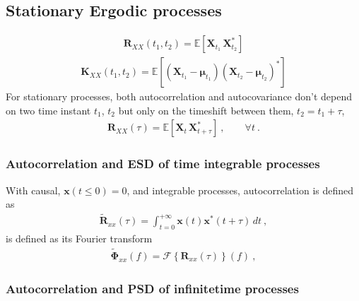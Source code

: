 \documentclass[letterpaper,10pt,english]{jupyterBook}
\begin{document}
\subsection{Stationary Ergodic processes}
\label{\detokenize{ch/system-theory/lti-response:stationary-ergodic-processes}}
\sphinxAtStartPar
{}
\begin{equation*}
\begin{split}\mathbf{R}_{XX}(t_1, t_2) = \mathbb{E}\left[ \mathbf{X}_{t_1} \, \mathbf{X}_{t_2}^* \right]\end{split}
\end{equation*}
\sphinxAtStartPar
{}
\begin{equation*}
\begin{split}\mathbf{K}_{XX}(t_1, t_2) = \mathbb{E}\left[ (\mathbf{X}_{t_1} - \boldsymbol{\mu}_{t_1} ) (\mathbf{X}_{t_2} - \boldsymbol{\mu}_{t_2} )^* \right]\end{split}
\end{equation*}
\sphinxAtStartPar
For stationary processes, both auto\sphinxhyphen{}correlation and auto\sphinxhyphen{}covariance don’t depend on two time instant \(t_1\), \(t_2\) but only on the time\sphinxhyphen{}shift between them, \(t_2 = t_1 + \tau\),
\begin{equation*}
\begin{split}\mathbf{R}_{XX}(\tau) = \mathbb{E}\left[ \mathbf{X}_{t} \, \mathbf{X}_{t + \tau}^* \right] \ , \qquad \forall t \ .\end{split}
\end{equation*}\subsubsection*{Autocorrelation and ESD of time integrable processes}

\sphinxAtStartPar
With causal, \(\mathbf{x}(t \le 0) = 0\), and integrable processes, autocorrelation is defined as
\begin{equation*}
\begin{split}\tilde{\mathbf{R}}_{xx}(\tau) = \int_{t = 0}^{+\infty} \mathbf{x}(t) \mathbf{x}^*(t+\tau) \, d t \ ,\end{split}
\end{equation*}
\sphinxAtStartPar
{} is defined as its Fourier transform
\begin{equation*}
\begin{split}\tilde{\boldsymbol{\Phi}}_{xx}(f) = \mathscr{F} \left\{ \mathbf{R}_{xx}(\tau) \right\} (f) \ ,\end{split}
\end{equation*}\subsubsection*{Autocorrelation and PSD of infinite\sphinxhyphen{}time processes}
\end{document}
